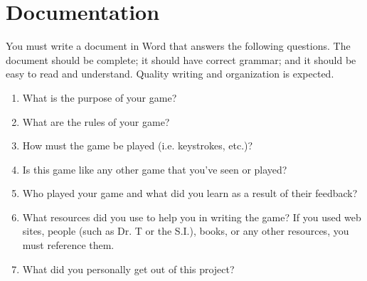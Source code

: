 \section*{Documentation}

You must write a document in Word that answers the following questions. The document should be complete; it should have correct grammar; and it should be easy to read and understand. Quality writing and organization is expected.

\begin{enumerate}
	\item What is the purpose of your game?
	\item What are the rules of your game?
	\item How must the game be played (i.e. keystrokes, etc.)?
	\item Is this game like any other game that you've seen or played?
	\item Who played your game and what did you learn as a result of their feedback?
	\item What resources did you use to help you in writing the game?  If you used web sites, people (such as Dr. T or the S.I.), books, or any other resources, you must reference them.
	\item What did you personally get out of this project?
\end{enumerate}
